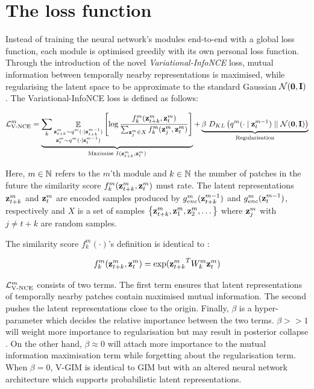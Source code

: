	
		
\section{The loss function} \label{cha:vgim_learning_objective}
	Instead of training the neural network's modules end-to-end with a global loss function, each module is optimised greedily with its own personal loss function. Through the introduction of the novel \textit{Variational-InfoNCE} loss, mutual information between temporally nearby representations is maximised, while regularising the latent space to be approximate to the standard Gaussian $\mathcal{N}(\bm{\mathbf{0}}, \mathbf{I})$. The Variational-InfoNCE loss is defined as follows:
	
	\begin{equation} %
		\Lvnce^m =
		\underbrace{\reconstrgim}_{\text{Maximise } I(\ztk^m, \zt^m)} + \underbrace{\beta ~ \latentspaceconstraintgim}_{\text{Regularisation}}
		\label{eq:variational_gim_loss}
	\end{equation}

	Here, $m \in \mathbb{N}$ refers to the $m$'th module and $k \in \mathbb{N}$ the number of patches in the future the similarity score $f_k^m({\mathbf{z}_{t+k}^m},{\mathbf{z}_t^m})$ must rate. The latent representations $\mathbf{z}_{t+k}^m$ and $\mathbf{z}_t^m$ are encoded samples produced by $g_{enc}^m(\mathbf{z}_{t+k}^{m-1})$ and $g_{enc}^m(\mathbf{z}_t^{m-1})$, respectively and $X$ is a set of samples ${ \left\{ \mathbf{z}_{t+k}^m, \mathbf{z}_1^m, \mathbf{z}_2^m, \dots \right\} }$ where $\mathbf{z}_j^m$ with $j \neq t \! + \! k$ are random samples.


	The similarity score $f_k^m(\cdot)$'s definition is identical to \citep{lowePuttingEndEndtoEnd2020a}:
	
	$$ f_k^m(\mathbf{z}_{t+k}^m,\mathbf{z}_t^m) = \exp({\mathbf{z}_{t+k}^m}^TW_k^m\mathbf{z}_t^m) $$
	
	
	$\mathcal{L}_{\text{V-NCE}}^m$ consists of two terms. The first term ensures that latent representations of temporally nearby patches contain maximised mutual information. The second pushes the latent representations close to the origin. Finally, $\beta$ is a hyper-parameter which decides the relative importance between the two terms. $\beta >> 1$ will weight more importance to regularisation but may result in posterior collapse \citep{lucasUnderstandingPosteriorCollapse2022}. On the other hand, $\beta \approx 0$ will attach more importance to the mutual information maximisation term while forgetting about the regularisation term. When $\beta = 0$, V-GIM is identical to GIM but with an altered neural network architecture which supports probabilistic latent representations.
	
